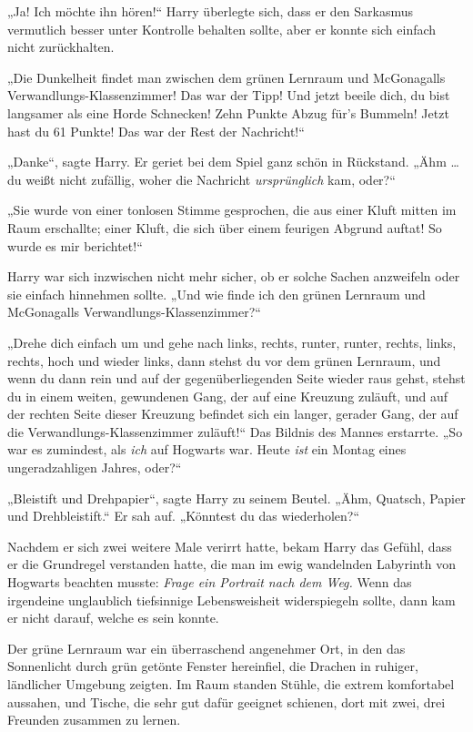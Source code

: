 „Ja! Ich möchte ihn hören!“ Harry überlegte sich, dass er den Sarkasmus vermutlich besser unter Kontrolle behalten sollte, aber er konnte sich einfach nicht zurückhalten. 

„Die Dunkelheit findet man zwischen dem grünen Lernraum und McGonagalls Verwandlungs-Klassenzimmer! Das war der Tipp! Und jetzt beeile dich, du bist langsamer als eine Horde Schnecken! Zehn Punkte Abzug für's Bummeln! Jetzt hast du 61 Punkte! Das war der Rest der Nachricht!“ 

„Danke“, sagte Harry. Er geriet bei dem Spiel ganz schön in Rückstand. „Ähm … du weißt nicht zufällig, woher die Nachricht \emph{ursprünglich} kam, oder?“ 

„Sie wurde von einer tonlosen Stimme gesprochen, die aus einer Kluft mitten im Raum erschallte; einer Kluft, die sich über einem feurigen Abgrund auftat! So wurde es mir berichtet!“ 

Harry war sich inzwischen nicht mehr sicher, ob er solche Sachen anzweifeln oder sie einfach hinnehmen sollte. „Und wie finde ich den grünen Lernraum und McGonagalls Verwandlungs-Klassenzimmer?“ 

„Drehe dich einfach um und gehe nach links, rechts, runter, runter, rechts, links, rechts, hoch und wieder links, dann stehst du vor dem grünen Lernraum, und wenn du dann rein und auf der gegenüberliegenden Seite wieder raus gehst, stehst du in einem weiten, gewundenen Gang, der auf eine Kreuzung zuläuft, und auf der rechten Seite dieser Kreuzung befindet sich ein langer, gerader Gang, der auf die Verwandlungs-Klassenzimmer zuläuft!“ Das Bildnis des Mannes erstarrte. „So war es zumindest, als \emph{ich} auf Hogwarts war. Heute \emph{ist} ein Montag eines ungeradzahligen Jahres, oder?“ 

„Bleistift und Drehpapier“, sagte Harry zu seinem Beutel. „Ähm, Quatsch, Papier und Drehbleistift.“ Er sah auf. „Könntest du das wiederholen?“ 

Nachdem er sich zwei weitere Male verirrt hatte, bekam Harry das Gefühl, dass er die Grundregel verstanden hatte, die man im ewig wandelnden Labyrinth von Hogwarts beachten musste: \emph{Frage ein Portrait nach dem Weg.} Wenn das irgendeine unglaublich tiefsinnige Lebensweisheit widerspiegeln sollte, dann kam er nicht darauf, welche es sein konnte. 

Der grüne Lernraum war ein überraschend angenehmer Ort, in den das Sonnenlicht durch grün getönte Fenster hereinfiel, die Drachen in ruhiger, ländlicher Umgebung zeigten. Im Raum standen Stühle, die extrem komfortabel aussahen, und Tische, die sehr gut dafür geeignet schienen, dort mit zwei, drei Freunden zusammen zu lernen. 

